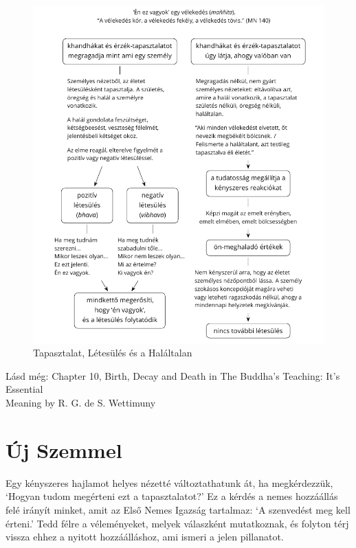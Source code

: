 \begin{figure}[h]
\caption{Tapasztalat, Létesülés és a Haláltalan}\label{fig-experience-becoming-deathless}
\bigskip
\includegraphics[width=\linewidth]{./manuscript/tex/diagrams/experience-becoming-deathless-hu.pdf}
\end{figure}

{\noindent\footnotesize
Lásd még: Chapter 10, Birth, Decay and Death in The Buddha's Teaching: It's Essential\\ Meaning by R. G. de S. Wettimuny
\par}

\clearpage
\normalpagelayout

\section{Új Szemmel}


\noindent Egy kényszeres hajlamot helyes nézetté változtathatunk át, ha
megkérdezzük, `Hogyan tudom megérteni ezt a tapasztalatot?' Ez a kérdés
a nemes hozzáállás felé irányít minket, amit az Első Nemes Igazság
tartalmaz: `A szenvedést meg kell érteni.' Tedd félre a véleményeket,
melyek válaszként mutatkoznak, és folyton térj vissza ehhez a nyitott
hozzáálláshoz, ami ismeri a jelen pillanatot.

